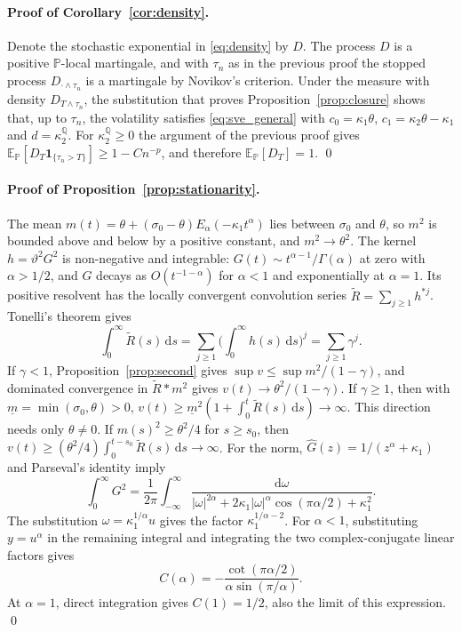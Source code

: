 \documentclass[11pt,a4paper]{article}
\theoremstyle{definition}
\newcommand{\D}{\mathrm{d}}
\newcommand{\E}{\mathbb{E}}
\newcommand{\Q}{\mathbb{Q}}
\renewcommand{\P}{\mathbb{P}}
\newcommand{\one}{\mathbf{1}}
\begin{document}
\paragraph{Proof of Corollary~\ref{cor:density}.} Denote the stochastic exponential in \eqref{eq:density} by $D$. The process $D$ is a positive $\P$-local martingale, and with $\tau_n$ as in the previous proof the stopped process $D_{\cdot\wedge\tau_n}$ is a martingale by Novikov's criterion. Under the measure with density $D_{T\wedge\tau_n}$, the substitution that proves Proposition~\ref{prop:closure} shows that, up to $\tau_n$, the volatility satisfies \eqref{eq:sve_general} with $c_0=\kappa_1\theta$, $c_1=\kappa_2\theta-\kappa_1$ and $d=\kappa_2^{\Q}$. For $\kappa_2^{\Q}\ge0$ the argument of the previous proof gives $\E_{\P}[D_T\one_{\{\tau_n>T\}}]\ge1-Cn^{-p}$, and therefore $\E_{\P}[D_T]=1$. \qed


\paragraph{Proof of Proposition~\ref{prop:stationarity}.} The mean $m(t)=\theta+(\sigma_0-\theta)E_\alpha(-\kappa_1t^\alpha)$ lies between $\sigma_0$ and $\theta$, so $m^2$ is bounded above and below by a positive constant, and $m^2\to\theta^2$. The kernel $h=\vartheta^2G^2$ is non-negative and integrable: $G(t)\sim t^{\alpha-1}/\Gamma(\alpha)$ at zero with $\alpha>1/2$, and $G$ decays as $O(t^{-1-\alpha})$ for $\alpha<1$ and exponentially at $\alpha=1$. Its positive resolvent has the locally convergent convolution series $\widetilde R=\sum_{j\ge1}h^{*j}$. Tonelli's theorem gives
\begin{equation*}
\int_0^\infty\widetilde R(s)\,\D s
=\sum_{j\ge1}\Big(\int_0^\infty h(s)\,\D s\Big)^j
=\sum_{j\ge1}\gamma^j.
\end{equation*}
If $\gamma<1$, Proposition~\ref{prop:second} gives $\sup v\le\sup m^2/(1-\gamma)$, and dominated convergence in $\widetilde R*m^2$ gives $v(t)\to\theta^2/(1-\gamma)$. If $\gamma\ge1$, then with $\underline m=\min(\sigma_0,\theta)>0$,
$v(t)\ge\underline m^2(1+\int_0^t\widetilde R(s)\,\D s)\to\infty$.
This direction needs only $\theta\ne0$. If $m(s)^2\ge\theta^2/4$ for $s\ge s_0$, then $v(t)\ge(\theta^2/4)\int_0^{t-s_0}\widetilde R(s)\,\D s\to\infty$.
For the norm, $\widehat G(z)=1/(z^\alpha+\kappa_1)$ and Parseval's identity imply
\begin{equation*}
\int_0^\infty G^2=\frac1{2\pi}\int_{-\infty}^\infty
\frac{\D\omega}{|\omega|^{2\alpha}+2\kappa_1|\omega|^\alpha\cos(\pi\alpha/2)+\kappa_1^2}.
\end{equation*}
The substitution $\omega=\kappa_1^{1/\alpha}u$ gives the factor $\kappa_1^{1/\alpha-2}$. For $\alpha<1$, substituting $y=u^\alpha$ in the remaining integral and integrating the two complex-conjugate linear factors gives
\begin{equation*}
C(\alpha)=-\frac{\cot(\pi\alpha/2)}{\alpha\sin(\pi/\alpha)}.
\end{equation*}
At $\alpha=1$, direct integration gives $C(1)=1/2$, also the limit of this expression. \qed
\end{document}
